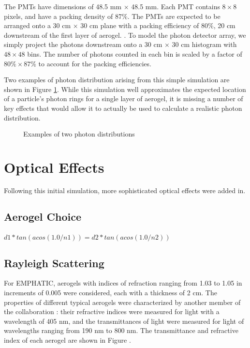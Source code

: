 The PMTs have dimensions of 48.5 mm $\times$ 48.5 mm.
Each PMT contains $8 \times 8$ pixels, and have a packing density of 87\%. 
The PMTs are expected to be arranged onto a 30 cm $\times$ 30 cm plane with a packing efficiency of $80\%$, 20 cm downstream of the first layer of aerogel.
.
To model the photon detector array, we simply project the photons downstream onto a 30 cm $\times$ 30 cm histogram with $48 \times 48$ bins.
The number of photons counted in each bin is scaled by a factor of $80\% \times 87\%$ to account for the packing efficiencies.

Two examples of photon distribution arising from this simple simulation are shown in Figure \ref{fig:noScat}. While this simulation well approximates the expected location of a particle's photon rings for a single layer of aerogel, it is missing a number of key effects that would allow it to actually be used to calculate a realistic photon distribution.


\begin{figure}[]
  \centering
  \hfill
  \caption{ Examples of two photon distributions }
  \label{fig:noScat}
\end{figure}

\section{Optical Effects}
Following this initial simulation, more sophisticated optical effects were added in. 

\subsection{Aerogel Choice}


$d1*tan(acos(1.0/n1)) = d2*tan(acos(1.0/n2)) $

\subsection{Rayleigh Scattering}

For EMPHATIC, aerogels with indices of refraction ranging from 1.03 to 1.05 in increments of 0.005 were considered, each with a thickness of 2 cm.
The properties of different typical aerogels were characterized by another member of the collaboration : their refractive indices were measured for light with a wavelength of 405 nm, and the transmittances of light were measured for light of wavelengths ranging from 190 nm to 800 nm.
The transmittance and refractive index of each aerogel are shown in Figure .

